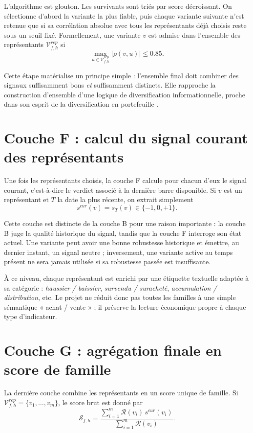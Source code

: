 L'algorithme est glouton. Les survivants sont triés par score décroissant. On
sélectionne d'abord la variante la plus fiable, puis chaque variante suivante
n'est retenue que si sa corrélation absolue avec tous les représentants déjà
choisis reste sous un seuil fixé. Formellement, une variante \(v\) est admise
dans l'ensemble des représentants \(\mathcal{V}^{rep}_{f,h}\) si
\begin{equation}
\max_{u\in\mathcal{V}^{rep}_{f,h}} |\rho(v,u)| \leq 0.85.
\label{eq:redundancy-threshold}
\end{equation}

Cette étape matérialise un principe simple : l'ensemble final doit combiner des
signaux suffisamment bons \emph{et} suffisamment distincts. Elle rapproche la
construction d'ensemble d'une logique de diversification informationnelle,
proche dans son esprit de la diversification en portefeuille \cite{markowitz1952}.

\section{Couche F : calcul du signal courant des représentants}
Une fois les représentants choisis, la couche F calcule pour chacun d'eux le
signal courant, c'est-à-dire le verdict associé à la dernière barre disponible.
Si \(v\) est un représentant et \(T\) la date la plus récente, on extrait
simplement
\[
s^{cur}(v)=s_T(v) \in \{-1,0,+1\}.
\]

Cette couche est distincte de la couche B pour une raison importante : la couche
B juge la qualité historique du signal, tandis que la couche F interroge son
état actuel. Une variante peut avoir une bonne robustesse historique et émettre,
au dernier instant, un signal neutre ; inversement, une variante active au temps
présent ne sera jamais utilisée si sa robustesse passée est insuffisante.

À ce niveau, chaque représentant est enrichi par une étiquette textuelle adaptée
à sa catégorie : \emph{haussier / baissier}, \emph{survendu / suracheté},
\emph{accumulation / distribution}, etc. Le projet ne réduit donc pas toutes les
familles à une simple sémantique « achat / vente » ; il préserve la lecture
économique propre à chaque type d'indicateur.

\section{Couche G : agrégation finale en score de famille}
La dernière couche combine les représentants en un score unique de famille. Si
\(\mathcal{V}^{rep}_{f,h}=\{v_1,\dots,v_m\}\), le score brut est donné par
\begin{equation}
\mathcal{S}_{f,h}=\frac{\sum_{i=1}^{m} \mathcal{R}(v_i)\,s^{cur}(v_i)}{\sum_{i=1}^{m} \mathcal{R}(v_i)}.
\label{eq:family-ensemble-raw}
\end{equation}

